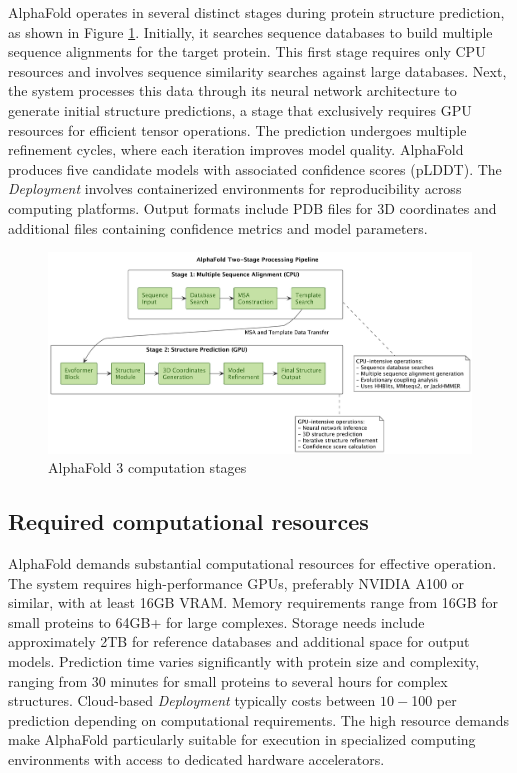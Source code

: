 AlphaFold operates in several distinct stages during protein structure prediction, as shown in Figure \ref{fig:alphafold}.
Initially, it searches sequence databases to build multiple sequence alignments for the target protein.
This first stage requires only CPU resources and involves sequence similarity searches against large databases.
Next, the system processes this data through its neural network architecture to generate initial structure predictions, a stage that exclusively requires GPU resources for efficient tensor operations.
The prediction undergoes multiple refinement cycles, where each iteration improves model quality.
AlphaFold produces five candidate models with associated confidence scores (pLDDT). The \textit{Deployment} involves containerized environments for reproducibility across computing platforms.
Output formats include PDB files for 3D coordinates and additional files containing confidence metrics and model parameters.

\begin{figure}[htbp]
    \centering
    \includegraphics[width=\textwidth]{images/alphafold.png}
    \caption{AlphaFold 3 computation stages}
    \label{fig:alphafold}
\end{figure}

\subsection{Required computational resources}

AlphaFold demands substantial computational resources for effective operation.
The system requires high-performance GPUs, preferably NVIDIA A100 or similar, with at least 16GB VRAM. Memory requirements range from 16GB for small proteins to 64GB+ for large complexes.
Storage needs include approximately 2TB for reference databases and additional space for output models.
Prediction time varies significantly with protein size and complexity, ranging from 30 minutes for small proteins to several hours for complex structures.
Cloud-based \textit{Deployment} typically costs between $10-$100 per prediction depending on computational requirements.
The high resource demands make AlphaFold particularly suitable for execution in specialized computing environments with access to dedicated hardware accelerators.


